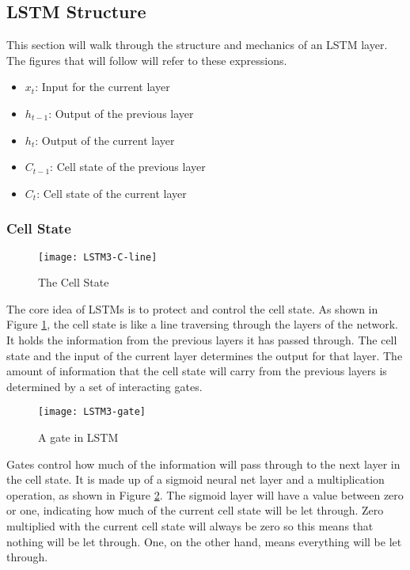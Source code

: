 \subsection{LSTM Structure}
    This section will walk through the structure and mechanics of an LSTM layer. The figures that will follow will refer to these expressions.
        \begin{itemize}
        \item \( x_t \): Input for the current layer
        \item \( h_{t-1} \): Output of the previous layer
        \item \( h_t \): Output of the current layer
        \item \( C_{t-1} \): Cell state of the previous layer
        \item \( C_t \): Cell state of the current layer
        \end{itemize}

    \subsubsection{Cell State}
        \begin{figure}[H]
        \centering
        \texttt{[image: LSTM3-C-line]}
        \caption{The Cell State \cite{olah2015understanding}}
        \label{fig:cell-state}
        \end{figure}
        The core idea of LSTMs is to protect and control the cell state. As shown in Figure \ref{fig:cell-state}, the cell state is like a line traversing through the layers of the network. It holds the information from the previous layers it has passed through. The cell state and the input of the current layer determines the output for that layer. The amount of information that the cell state will carry from the previous layers is determined by a set of interacting gates.

        \begin{figure}[H]
        \centering
        \texttt{[image: LSTM3-gate]}
        \caption{A gate in LSTM \cite{olah2015understanding}}
        \label{fig:lstm-gate}
        \end{figure}
        Gates control how much of the information will pass through to the next layer in the cell state. It is made up of a sigmoid neural net layer and a multiplication operation, as shown in Figure \ref{fig:lstm-gate}. The sigmoid layer will have a value between zero or one, indicating how much of the current cell state will be let through. Zero multiplied with the current cell state will always be zero so this means that nothing will be let through. One, on the other hand, means everything will be let through.

